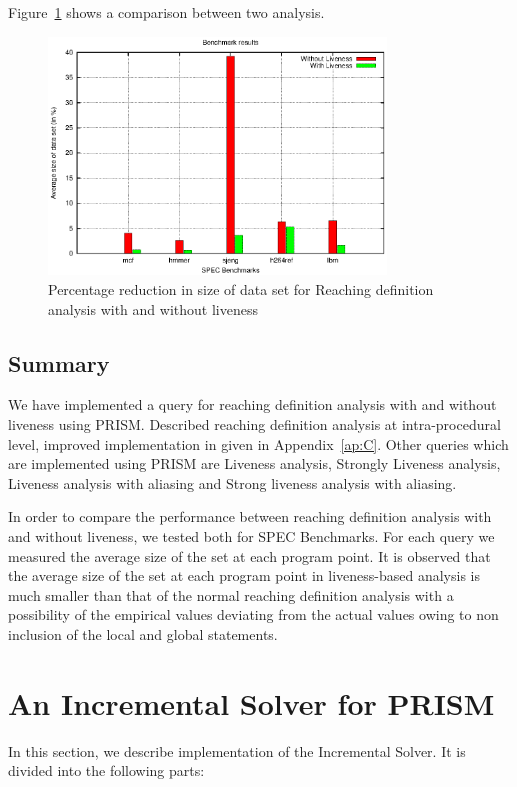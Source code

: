 \documentclass[11pt,a4paper,openright]{report}
\begin{document}
Figure~\ref{fig:bench_mark} shows a comparison between two analysis.
\begin{figure}[H]	
\centering
\includegraphics[width=0.8\textwidth]{graph.eps}
\caption{Percentage reduction in size of data set for Reaching definition analysis with and without liveness}
\label{fig:bench_mark}
\end{figure}


\section{Summary}
We have implemented a query for reaching definition analysis with and without liveness using PRISM.
Described reaching definition analysis at intra-procedural level, improved implementation in given in Appendix~\ref{ap:C}.
Other queries which are implemented using PRISM are Liveness analysis, Strongly Liveness analysis, Liveness analysis with aliasing
and Strong liveness analysis with aliasing. 

In order to compare the performance between reaching definition analysis with and without liveness, we tested both for SPEC Benchmarks.
For each query we measured the average size of the set at each program point. It is observed that the average size of the set at each program 
point in liveness-based analysis is much smaller than that of the normal reaching definition analysis with a possibility of the empirical
values deviating from the actual values owing to non inclusion of the local and global statements.


\chapter{An Incremental Solver for PRISM}
In this section, we describe implementation of the Incremental Solver. It is divided into the following parts:
\end{document}
